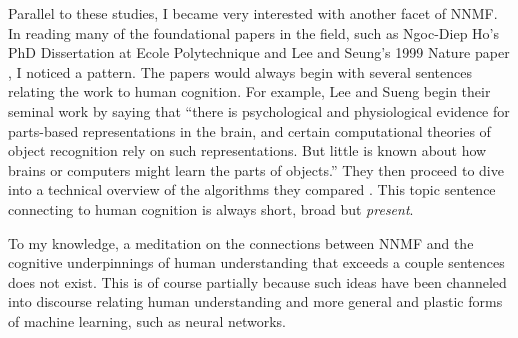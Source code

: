 \documentclass[12pt]{pom_thesis}
\begin{document}
Parallel to these studies, I became very interested with another facet of NNMF. In reading many of the foundational papers in the field, such as Ngoc-Diep Ho's PhD Dissertation at Ecole Polytechnique \cite{ho2008nonnegative} and Lee and Seung's 1999 Nature paper \cite{lee1999learning}, I noticed a pattern. The papers would always begin with several sentences relating the work to human cognition. For example, Lee and Sueng begin their seminal work by saying that ``there
is psychological and physiological evidence for parts-based representations in the brain, and certain computational theories of object recognition rely on such representations. But little is known about how brains or computers might learn the parts of objects.'' They then proceed to dive into a technical overview of the algorithms they compared \cite{lee1999learning}. This topic sentence connecting to human cognition is always short, broad but \textit{present}.

To my knowledge, a meditation on the connections between NNMF and the cognitive underpinnings of human understanding that exceeds a couple sentences does not exist. This is of course partially because such ideas have been channeled into discourse relating human understanding and more general and plastic forms of machine learning, such as neural networks. 
\end{document}
